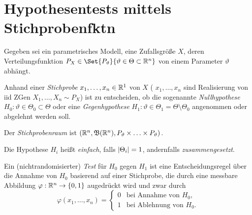\documentclass{cheat-sheet}
\newcommand{\Bor}{\mathfrak{B}} %
\begin{document}


\section{Hypothesentests mittels Stichprobenfktn}



\begin{modell}
  Gegeben sei ein parametrisches Modell, \dh eine Zufallsgröße $X$, deren Verteilungsfunktion $P_X \in \Set{P_\vartheta}{\vartheta \in \Theta \subset \R^n}$ von einem Parameter $\vartheta$ abhängt.
\end{modell}

\begin{prob}
  Anhand einer \emph{Stichprobe} $x_1, \ldots, x_n \in \mathbb{R}^1$ von $X$ (\dh{} $x_1, \ldots, x_n$ sind Realisierung von iid ZGen $X_1, \ldots, X_n \sim P_X$) ist zu entscheiden, ob die sogenannte \emph{Nullhypothese} $H_0 : \vartheta \in \Theta_0 \subset \Theta$ oder eine \emph{Gegenhypothese} $H_1 : \vartheta \in \Theta_1 = \Theta \setminus \Theta_0$ angenommen oder abgelehnt werden soll.
\end{prob}

\begin{defn}
  Der \emph{Stichprobenraum} ist $(\R^n, \Bor(\R^n), P_\vartheta \times \ldots \times P_\vartheta)$.
\end{defn}

\begin{terminologie}
  Die Hypothese $H_i$ heißt \emph{einfach}, falls $\lvert\Theta_i\rvert = 1$, andernfalls \emph{zusammengesetzt}.
\end{terminologie}

\begin{defn}
  Ein (nichtrandomisierter) \emph{Test} für $H_0$ gegen $H_1$ ist eine Entscheidungsregel über die Annahme von $H_0$ basierend auf einer Stichprobe, die durch eine messbare Abbildung $\varphi : \mathbb{R}^n \to \{ 0, 1 \}$ augedrückt wird und zwar durch
  \[ \varphi(x_1, \ldots, x_n) = \begin{cases}
    0 & \text{bei Annahme von $H_0$,} \\
    1 & \text{bei Ablehnung von $H_0$.}
  \end{cases} \]
\end{defn}
\end{document}

